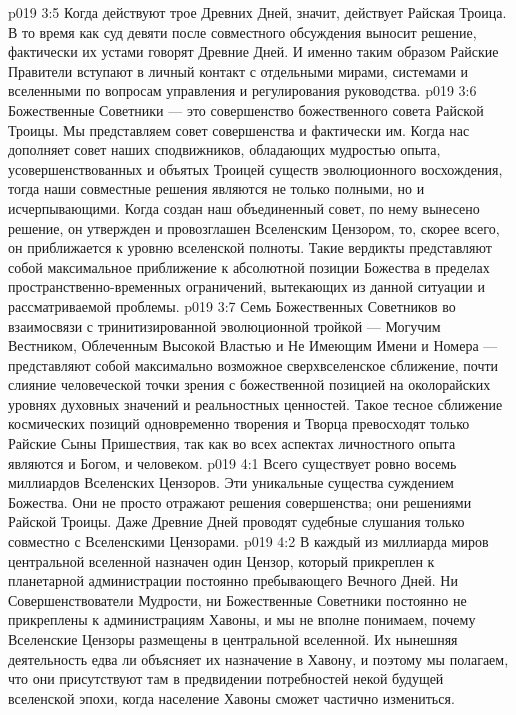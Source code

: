 \vs p019 3:5 Когда действуют трое Древних Дней, значит, действует Райская Троица. В то время как суд девяти после совместного обсуждения выносит решение, фактически их устами говорят Древние Дней. И именно таким образом Райские Правители вступают в личный контакт с отдельными мирами, системами и вселенными по вопросам управления и регулирования руководства.
\vs p019 3:6 \pc Божественные Советники --- это совершенство божественного совета Райской Троицы. Мы представляем совет совершенства и фактически  им. Когда нас дополняет совет наших сподвижников, обладающих мудростью опыта, усовершенствованных и объятых Троицей существ эволюционного восхождения, тогда наши совместные решения являются не только полными, но и исчерпывающими. Когда создан наш объединенный совет, по нему вынесено решение, он утвержден и провозглашен Вселенским Цензором, то, скорее всего, он приближается к уровню вселенской полноты. Такие вердикты представляют собой максимальное приближение к абсолютной позиции Божества в пределах пространственно\hyp{}временных ограничений, вытекающих из данной ситуации и рассматриваемой проблемы.
\vs p019 3:7 Семь Божественных Советников во взаимосвязи с тринитизированной эволюционной тройкой --- Могучим Вестником, Облеченным Высокой Властью и Не Имеющим Имени и Номера --- представляют собой максимально возможное сверхвселенское сближение, почти слияние человеческой точки зрения с божественной позицией на околорайских уровнях духовных значений и реальностных ценностей. Такое тесное сближение космических позиций одновременно творения и Творца превосходят только Райские Сыны Пришествия, так как во всех аспектах личностного опыта являются и Богом, и человеком.
\vs p019 4:1 Всего существует ровно восемь миллиардов Вселенских Цензоров. Эти уникальные существа  суждением Божества. Они не просто отражают решения совершенства; они  решениями Райской Троицы. Даже Древние Дней проводят судебные слушания только совместно с Вселенскими Цензорами.
\vs p019 4:2 В каждый из миллиарда миров центральной вселенной назначен один Цензор, который прикреплен к планетарной администрации постоянно пребывающего Вечного Дней. Ни Совершенствователи Мудрости, ни Божественные Советники постоянно не прикреплены к администрациям Хавоны, и мы не вполне понимаем, почему Вселенские Цензоры размещены в центральной вселенной. Их нынешняя деятельность едва ли объясняет их назначение в Хавону, и поэтому мы полагаем, что они присутствуют там в предвидении потребностей некой будущей вселенской эпохи, когда население Хавоны сможет частично измениться.
